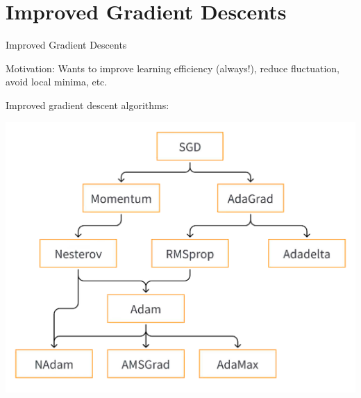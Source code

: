 \documentclass{beamer}
\begin{document}
\section{Improved Gradient Descents}
\begin{frame}{Improved Gradient Descents}

Motivation: Wants to improve learning efficiency (always!), reduce fluctuation, avoid local minima, etc.

Improved gradient descent algorithms:
\begin{center}
    \includegraphics[width=.7\columnwidth]{img/improve.png}
\end{center}
\end{frame}
\end{document}
